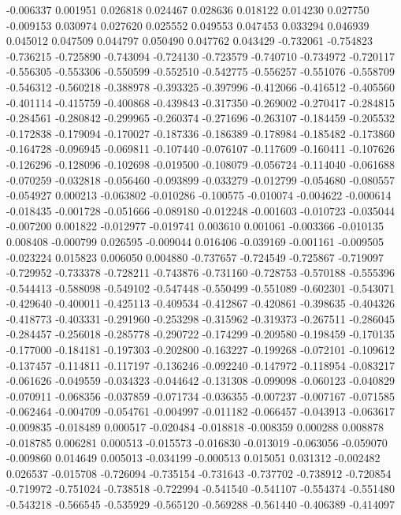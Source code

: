 -0.006337
0.001951
0.026818
0.024467
0.028636
0.018122
0.014230
0.027750
-0.009153
0.030974
0.027620
0.025552
0.049553
0.047453
0.033294
0.046939
0.045012
0.047509
0.044797
0.050490
0.047762
0.043429
-0.732061
-0.754823
-0.736215
-0.725890
-0.743094
-0.724130
-0.723579
-0.740710
-0.734972
-0.720117
-0.556305
-0.553306
-0.550599
-0.552510
-0.542775
-0.556257
-0.551076
-0.558709
-0.546312
-0.560218
-0.388978
-0.393325
-0.397996
-0.412066
-0.416512
-0.405560
-0.401114
-0.415759
-0.400868
-0.439843
-0.317350
-0.269002
-0.270417
-0.284815
-0.284561
-0.280842
-0.299965
-0.260374
-0.271696
-0.263107
-0.184459
-0.205532
-0.172838
-0.179094
-0.170027
-0.187336
-0.186389
-0.178984
-0.185482
-0.173860
-0.164728
-0.096945
-0.069811
-0.107440
-0.076107
-0.117609
-0.160411
-0.107626
-0.126296
-0.128096
-0.102698
-0.019500
-0.108079
-0.056724
-0.114040
-0.061688
-0.070259
-0.032818
-0.056460
-0.093899
-0.033279
-0.012799
-0.054680
-0.080557
-0.054927
0.000213
-0.063802
-0.010286
-0.100575
-0.010074
-0.004622
-0.000614
-0.018435
-0.001728
-0.051666
-0.089180
-0.012248
-0.001603
-0.010723
-0.035044
-0.007200
0.001822
-0.012977
-0.019741
0.003610
0.001061
-0.003366
-0.010135
0.008408
-0.000799
0.026595
-0.009044
0.016406
-0.039169
-0.001161
-0.009505
-0.023224
0.015823
0.006050
0.004880
-0.737657
-0.724549
-0.725867
-0.719097
-0.729952
-0.733378
-0.728211
-0.743876
-0.731160
-0.728753
-0.570188
-0.555396
-0.544413
-0.588098
-0.549102
-0.547448
-0.550499
-0.551089
-0.602301
-0.543071
-0.429640
-0.400011
-0.425113
-0.409534
-0.412867
-0.420861
-0.398635
-0.404326
-0.418773
-0.403331
-0.291960
-0.253298
-0.315962
-0.319373
-0.267511
-0.286045
-0.284457
-0.256018
-0.285778
-0.290722
-0.174299
-0.209580
-0.198459
-0.170135
-0.177000
-0.184181
-0.197303
-0.202800
-0.163227
-0.199268
-0.072101
-0.109612
-0.137457
-0.114811
-0.117197
-0.136246
-0.092240
-0.147972
-0.118954
-0.083217
-0.061626
-0.049559
-0.034323
-0.044642
-0.131308
-0.099098
-0.060123
-0.040829
-0.070911
-0.068356
-0.037859
-0.071734
-0.036355
-0.007237
-0.007167
-0.071585
-0.062464
-0.004709
-0.054761
-0.004997
-0.011182
-0.066457
-0.043913
-0.063617
-0.009835
-0.018489
0.000517
-0.020484
-0.018818
-0.008359
0.000288
0.008878
-0.018785
0.006281
0.000513
-0.015573
-0.016830
-0.013019
-0.063056
-0.059070
-0.009860
0.014649
0.005013
-0.034199
-0.000513
0.015051
0.031312
-0.002482
0.026537
-0.015708
-0.726094
-0.735154
-0.731643
-0.737702
-0.738912
-0.720854
-0.719972
-0.751024
-0.738518
-0.722994
-0.541540
-0.541107
-0.554374
-0.551480
-0.543218
-0.566545
-0.535929
-0.565120
-0.569288
-0.561440
-0.406389
-0.414097

